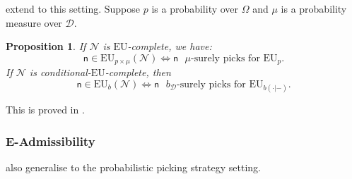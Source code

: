 \documentclass[a4paper]{article}
\newtheorem{proposition}[theorem]{Proposition}
\newcommand\EU{\mathrm{EU}}
\newcommand{\D}{\mathcal{D}}
\newcommand{\Decs}{\mathcal{D}}
\newcommand{\n}{\mathsf{n}}
\newcommand\Nu{\mathcal{N}}
\newcommand{\IB}{\mathbb{B}}
\renewcommand{\color}[1]{}
\newenvironment{colored}[1]{\leavevmode\color{#1}}{}
\newenvironment{CCM rewritten}
{\begingroup\color{blue}} %
{\endgroup}              %
\begin{document}
	
	



 extend to this setting.
Suppose $p$ is a probability over $\Omega$ and $\mu$ is a probability measure over $\D$.
\begin{proposition}\label{thm:eu-nu-nec-suff}
If $\Nu$ is $\EU$-complete, we have:
$$\n \in \EU_{p\times \mu}(\Nu) \Leftrightarrow \n \text{ $\mu$-surely picks for $\EU_p$.}$$
If $\Nu$ is conditional-$\EU$-complete, then
$$\n \in \EU_{b}(\Nu) \Leftrightarrow \n \text{ $b_\Decs$-surely picks for $\EU_{b(\cdot|-)}$.}$$
\end{proposition}
This is proved in .

\subsubsection{E-Admissibility}
 also generalise to the probabilistic picking strategy setting. 

\end{document}
